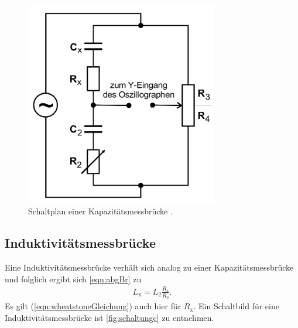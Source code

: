 \begin{figure}[H]
    \centering
    \includegraphics[width=0.75\textwidth]{dateien/aufgabeb).png}
    \caption{Schaltplan einer Kapazitätsmessbrücke \cite{anleitung}.}
    \label{fig:schaltungb}
\end{figure}

\subsection{Induktivitätsmessbrücke}
Eine Induktivitätsmessbrücke verhält sich analog zu einer Kapazitätsmessbrücke und folglich ergibt sich 
\autoref{eqn:abgBr} zu
\begin{align}
    L_{\text{x}} = L_2 \frac{R_4}{R_3}.
    \label{eqn:induktivitaetsmess}
\end{align}
Es gilt (\ref{eqn:wheatstoneGleichung}) auch hier für $R_{\text{x}}$.
Ein Schaltbild für eine Induktivitätsmessbrücke ist \autoref{fig:schaltungc} zu entnehmen.


